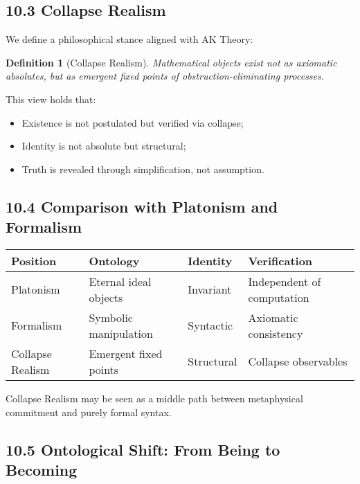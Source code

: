 \documentclass[11pt]{article}
\newtheorem{definition}[theorem]{Definition}
\begin{document}
\subsection{10.3 Collapse Realism}

We define a philosophical stance aligned with AK Theory:

\begin{definition}[Collapse Realism]
Mathematical objects exist not as axiomatic absolutes, but as emergent fixed points of obstruction-eliminating processes.
\end{definition}

This view holds that:

\begin{itemize}
    \item Existence is not postulated but verified via collapse;
    \item Identity is not absolute but structural;
    \item Truth is revealed through simplification, not assumption.
\end{itemize}

\subsection{10.4 Comparison with Platonism and Formalism}

\vspace{0.5em}
\begin{center}
\begin{tabular}{|l|l|l|l|}
\hline
\textbf{Position} & \textbf{Ontology} & \textbf{Identity} & \textbf{Verification} \\
\hline
Platonism & Eternal ideal objects & Invariant & Independent of computation \\
\hline
Formalism & Symbolic manipulation & Syntactic & Axiomatic consistency \\
\hline
Collapse Realism & Emergent fixed points & Structural & Collapse observables \\
\hline
\end{tabular}
\end{center}
\vspace{0.5em}

Collapse Realism may be seen as a middle path between metaphysical commitment and purely formal syntax.

\subsection{10.5 Ontological Shift: From Being to Becoming}
\end{document}
